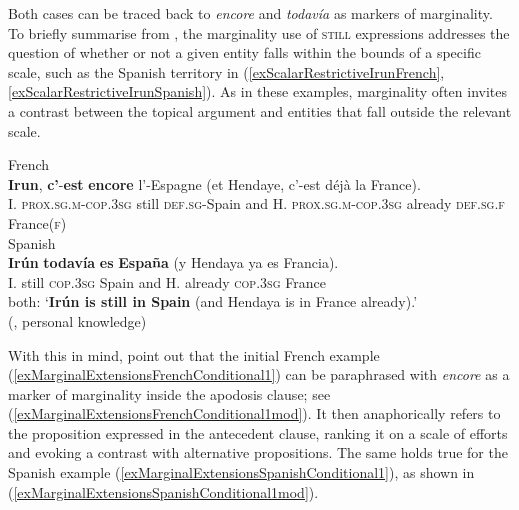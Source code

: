 Both cases can be traced back to \textit{encore} and \textit{todavía} as markers of marginality. To briefly summarise from , the marginality use of \textsc{still} expressions addresses the question of whether or not a given entity falls within the bounds of a specific scale, such as the Spanish territory in (\ref{exScalarRestrictiveIrunFrench}, \ref{exScalarRestrictiveIrunSpanish}). As in these examples, marginality often invites a contrast between the topical argument and entities that fall outside the relevant scale.

\begin{exe}
	\ex\label{exScalarRestrictiveIrun}
		\begin{xlist}
	 \ex French\label{exScalarRestrictiveIrunFrench}\\
	\gll \textbf{Irun}, \textbf{c'}-\textbf{est} \textbf{encore} l'-Espagne (et Hendaye, c'-est déjà la France).\\
	I. \textsc{prox}.\textsc{sg}.\textsc{m}-\textsc{cop}.3\textsc{sg} still \textsc{def}.\textsc{sg}-Spain \phantom{(}and H. \textsc{prox}.\textsc{sg}.\textsc{m}-\textsc{cop}.3\textsc{sg} already \textsc{def}.\textsc{sg}.\textsc{f} France(\textsc{f})\\
	\pagebreak
	\ex\label{exScalarRestrictiveIrunSpanish}Spanish\\
	\gll \textbf{Irún} \textbf{todavía} \textbf{es} \textbf{España} (y Hendaya ya es Francia).\\
	I. still \textsc{cop}.3\textsc{sg} Spain  \phantom{(}and H. already \textsc{cop}.3\textsc{sg} France\\
	\glt both: \lq\textbf{Irún is still in Spain} (and Hendaya is in France already).'\\ (\cite[58]{Garrido1991}, personal knowledge)
	\end{xlist}
\end{exe}

With this in mind, \textcite[83–84]{VictorriFuchs1996} point out that the initial French example (\ref{exMarginalExtensionsFrenchConditional1}) can be paraphrased with \textit{encore} as a marker of marginality inside the apodosis clause; see (\ref{exMarginalExtensionsFrenchConditional1mod}). It then anaphorically refers to the proposition expressed in the antecedent clause, ranking it on a scale of efforts and evoking a contrast with alternative propositions. The same holds true for the Spanish example (\ref{exMarginalExtensionsSpanishConditional1}), as shown in (\ref{exMarginalExtensionsSpanishConditional1mod}).

